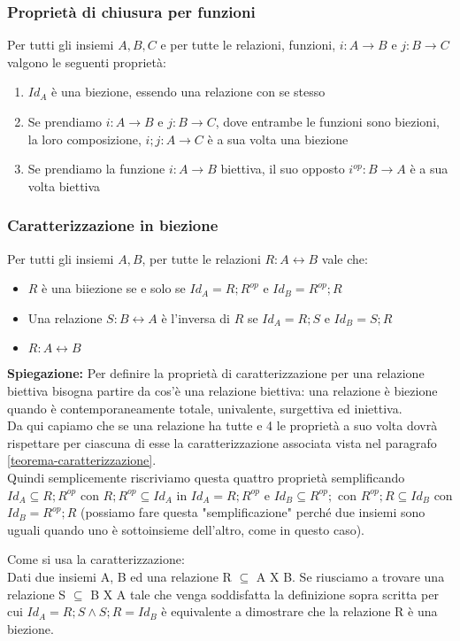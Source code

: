 \subsubsection{Proprietà di chiusura per funzioni}
Per tutti gli insiemi $A, B, C$ e per tutte le relazioni, funzioni, $i: A \rightarrow B$ e $j: B \rightarrow C$ valgono le seguenti proprietà:
\begin{enumerate}
    \item $Id_A$ è una biezione, essendo una relazione con se stesso
    \item Se prendiamo $i: A \rightarrow B$ e $j: B \rightarrow C$, dove entrambe le funzioni sono biezioni, la loro composizione, $i;j: A \rightarrow C$ è a sua volta una biezione
    \item Se prendiamo la funzione $i: A \rightarrow B$ biettiva, il suo opposto $i^{op}: B \rightarrow A$ è a sua volta biettiva
\end{enumerate}

\subsubsection{Caratterizzazione in biezione}\label{caratterizzazione-biezione}
Per tutti gli insiemi $A, B$, per tutte le relazioni $R: A\leftrightarrow B$ vale che:
\begin{itemize}
	\item $R$ è una biiezione se e solo se $Id_A = R;R^{op}$ e $Id_B = R^{op};R$
	\item Una relazione $S:B\leftrightarrow A$ è l'inversa di $R$ se $Id_A = R;S$ e $Id_B = S;R$
	\item $R:A\leftrightarrow B$
\end{itemize}

\textbf{Spiegazione:} Per definire la proprietà di caratterizzazione per una relazione biettiva bisogna partire da cos'è una relazione biettiva: una relazione è biezione quando è contemporaneamente totale, univalente, surgettiva ed iniettiva. \\Da qui capiamo che se una relazione ha tutte e 4 le proprietà a suo volta dovrà rispettare per ciascuna di esse la caratterizzazione associata vista nel paragrafo \ref{teorema-caratterizzazione}. \\Quindi semplicemente riscriviamo questa quattro proprietà semplificando $Id_A \subseteq R;R^{op}$ con $R;R^{op} \subseteq Id_A$ in $Id_A = R;R^{op}$ e $Id_B \subseteq R^{op};$ con $R^{op};R \subseteq Id_B$ con $Id_B = R^{op};R$ (possiamo fare questa "semplificazione" perché due insiemi sono uguali quando uno è sottoinsieme dell'altro, come in questo caso).
\begin{example}
    Come si usa la caratterizzazione:\\
    Dati due insiemi A, B ed una relazione R $\subseteq$ A X B. Se riusciamo a trovare una relazione S $\subseteq$ B X A tale che venga soddisfatta la definizione sopra scritta per cui $Id_A = R;S \land S;R = Id_B$ è equivalente a dimostrare che la relazione R è una biezione.
\end{example}

